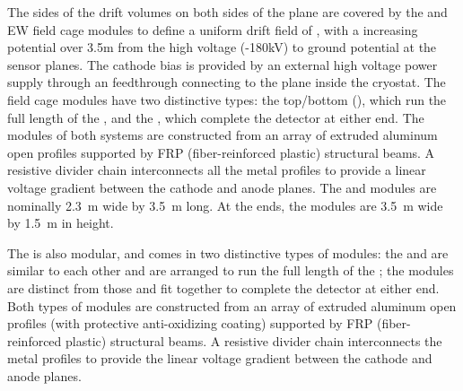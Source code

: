 The sides of the drift volumes on both sides of the  plane are covered by the  and EW field cage modules to define a uniform drift field of \spmaxfield{}, with a increasing potential over 3.5m from the high voltage  (-180kV) to ground potential at the  sensor planes. The cathode bias is provided by an external high voltage power supply through an  feedthrough connecting to the  plane inside the cryostat.
The field cage modules have two distinctive types: the top/bottom (), which run the full length of the , and the , %
which complete the detector at either end. The modules of both systems are constructed from an array of extruded aluminum open profiles supported by FRP (fiber-reinforced plastic) structural beams. A resistive divider chain interconnects all the metal profiles to provide a linear voltage gradient between the cathode and anode planes.  The  and  modules are nominally  \SI{2.3}{\meter} wide by  \SI{3.5}{\meter} long. At the ends, the  modules are \SI{3.5}{\meter} wide by \SI{1.5}{\meter} in height.


The  is also modular, and comes in two distinctive types of modules: the  and  are similar to each other and are arranged to run the full length of the ; the  modules are distinct from those and fit together to
complete the detector at either end. Both types of  modules are constructed from an array of extruded aluminum open profiles (with protective anti-oxidizing coating) supported by FRP (fiber-reinforced plastic) structural beams. A resistive divider chain interconnects  the metal profiles to provide the linear voltage gradient between the cathode and anode planes.  

